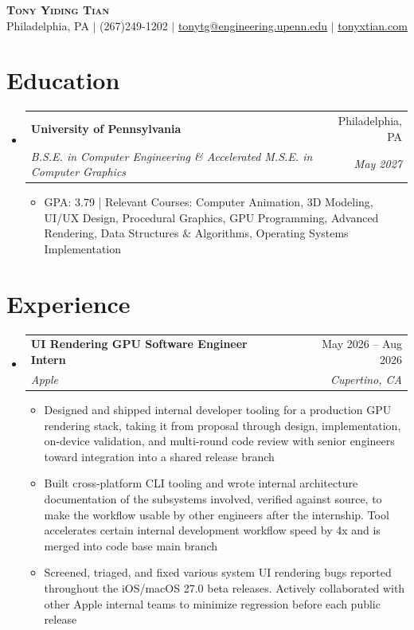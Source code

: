 \documentclass[letterpaper,11pt]{article}
\makeatletter
\newcommand{\resumeItem}[1]{
  \item\small{
    {#1 \vspace{-3pt}}
  }
}
\newcommand{\resumeSubheading}[4]{
  \vspace{-2pt}\item
    \begin{tabular*}{0.97\textwidth}[t]{l@{\extracolsep{\fill}}r}
      \textbf{#1} & #2 \\
      \textit{\small#3} & \textit{\small #4} \\
    \end{tabular*}\vspace{-7pt}
}
\newcommand{\resumeSubHeadingListStart}{\begin{itemize}[leftmargin=0.15in, label={}]}
\newcommand{\resumeSubHeadingListEnd}{\end{itemize}}
\newcommand{\resumeItemListStart}{\begin{itemize}}
\newcommand{\resumeItemListEnd}{\end{itemize}\vspace{-5pt}}
\makeatother
\begin{document}
\begin{center}
    \textbf{\Huge \scshape Tony Yiding Tian} \\ \vspace{1pt}
    \small Philadelphia, PA $|$ (267)249-1202 $|$ \href{mailto:tonytg@engineering.upenn.edu}{\underline{tonytg@engineering.upenn.edu}} $|$
    \href{https://tonyxtian.com}{\underline{tonyxtian.com}}
\end{center}

\section{Education}
  \resumeSubHeadingListStart
    \resumeSubheading
      {University of Pennsylvania}{Philadelphia, PA}
      {B.S.E. in Computer Engineering \& Accelerated M.S.E. in Computer Graphics}{May 2027}
      \resumeItemListStart
        \resumeItem{GPA: 3.79 | Relevant Courses: Computer Animation, 3D Modeling, UI/UX Design, Procedural Graphics, GPU Programming, Advanced Rendering, Data Structures \& Algorithms, Operating Systems Implementation}
      \resumeItemListEnd
  \resumeSubHeadingListEnd

  \section{Experience}
  \resumeSubHeadingListStart
    \resumeSubheading
      {UI Rendering GPU Software Engineer Intern}{May 2026 -- Aug 2026}
      {Apple}{Cupertino, CA}
      \resumeItemListStart
        \resumeItem{Designed and shipped internal developer tooling for a production GPU rendering stack, taking it from proposal through design, implementation, on-device validation, and multi-round code review with senior engineers toward integration into a shared release branch}
        \resumeItem{Built cross-platform CLI tooling and wrote internal architecture documentation of the subsystems involved, verified against source, to make the workflow usable by other engineers after the internship. Tool accelerates certain internal development workflow speed by 4x and is merged into code base main branch}
        \resumeItem{Screened, triaged, and fixed various system UI rendering bugs reported throughout the iOS/macOS 27.0 beta releases. Actively collaborated with other Apple internal teams to minimize regression before each public release}
    \resumeItemListEnd
  \resumeSubHeadingListEnd

\end{document}

